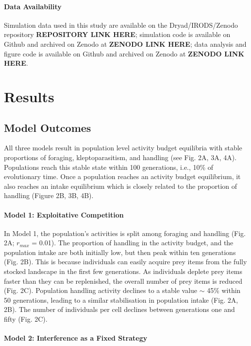 \documentclass[11pt]{article}
\begin{document}
\paragraph*{Data Availability}

Simulation data used in this study are available on the Dryad/IRODS/Zenodo repository \textbf{REPOSITORY LINK HERE}; 
simulation code is available on Github and archived on Zenodo at \textbf{ZENODO LINK HERE}; 
data analysis and figure code is available on Github and archived on Zenodo at \textbf{ZENODO LINK HERE}.

\section{Results}

\subsection{Model Outcomes}

All three models result in population level activity budget equilibria with stable proportions of foraging, kleptoparasitism, and handling (see Fig. 2A, 3A, 4A).
Populations reach this stable state within 100 generations, i.e., 10\% of evolutionary time.
Once a population reaches an activity budget equilibrium, it also reaches an intake equilibrium which is closely related to the proportion of handling (Figure 2B, 3B, 4B).

\paragraph{Model 1: Exploitative Competition}

In Model 1, the population's activities is split among foraging and handling (Fig. 2A; $r_{max}$ = 0.01).
The proportion of handling in the activity budget, and the population intake are both initially low, but then peak within ten generations (Fig. 2B).
This is because individuals can easily acquire prey items from the fully stocked landscape in the first few generations.
As individuals deplete prey items faster than they can be replenished, the overall number of prey items is reduced (Fig. 2C).
Population handling activity declines to a stable value $\sim$ 45\% within 50 generations, leading to a similar stabilisation in population intake (Fig. 2A, 2B).
The number of individuals per cell declines between generations one and fifty (Fig. 2C).

\paragraph{Model 2: Interference as a Fixed Strategy}
\end{document}
